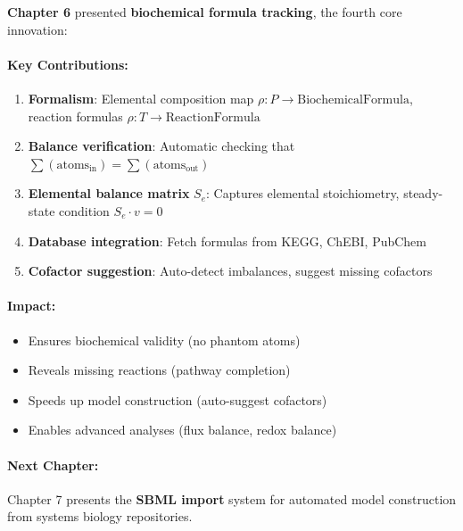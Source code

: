 \textbf{Chapter 6} presented \textbf{biochemical formula tracking}, the fourth core innovation:

\paragraph{Key Contributions:}
\begin{enumerate}
    \item \textbf{Formalism}: Elemental composition map $\rho: P \to \text{BiochemicalFormula}$, reaction formulas $\rho: T \to \text{ReactionFormula}$
    \item \textbf{Balance verification}: Automatic checking that $\sum(\text{atoms}_{\text{in}}) = \sum(\text{atoms}_{\text{out}})$
    \item \textbf{Elemental balance matrix} $S_e$: Captures elemental stoichiometry, steady-state condition $S_e \cdot v = 0$
    \item \textbf{Database integration}: Fetch formulas from KEGG, ChEBI, PubChem
    \item \textbf{Cofactor suggestion}: Auto-detect imbalances, suggest missing cofactors
\end{enumerate}

\paragraph{Impact:}
\begin{itemize}
    \item Ensures biochemical validity (no phantom atoms)
    \item Reveals missing reactions (pathway completion)
    \item Speeds up model construction (auto-suggest cofactors)
    \item Enables advanced analyses (flux balance, redox balance)
\end{itemize}

\paragraph{Next Chapter:} Chapter 7 presents the \textbf{SBML import} system for automated model construction from systems biology repositories.
